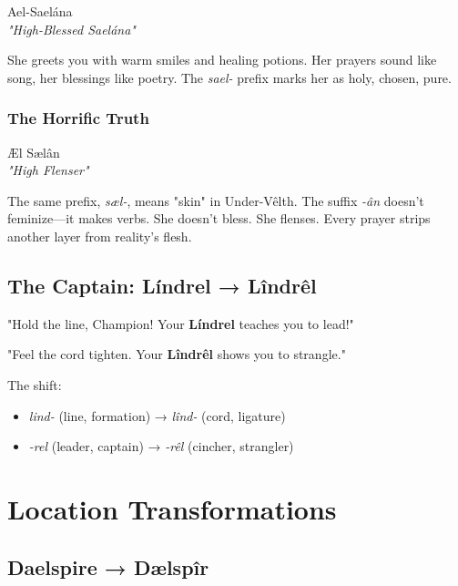 \documentclass[11pt,a4paper,twoside]{book}
\begin{document}
\displayfont Ael-Saelána\\
\normalfont
\textit{"High-Blessed Saelána"}

She greets you with warm smiles and healing potions. Her prayers sound like song, her blessings like poetry. The \textit{sael-} prefix marks her as holy, chosen, pure.

\subsection{The Horrific Truth}

\runefont Æl Sælân\\
\normalfont
\textit{"High Flenser"}

The same prefix, \textit{sæl-}, means "skin" in Under-Vêlth. The suffix \textit{-ân} doesn't feminize—it makes verbs. She doesn't bless. She flenses. Every prayer strips another layer from reality's flesh.

\section{The Captain: Líndrel → Lîndrêl}

\begin{tcolorbox}[heroicbox={Combat Training}]
"Hold the line, Champion! Your \textbf{Líndrel} teaches you to lead!"
\end{tcolorbox}

\begin{tcolorbox}[horrorbox={The Garrote}]
"Feel the cord tighten. Your \textbf{Lîndrêl} shows you to strangle."
\end{tcolorbox}

The shift:
\begin{itemize}
    \item \textit{lind-} (line, formation) → \textit{lînd-} (cord, ligature)
    \item \textit{-rel} (leader, captain) → \textit{-rêl} (cincher, strangler)
\end{itemize}

\chapter{Location Transformations}

\section{Daelspire → Dælspîr}
\end{document}
